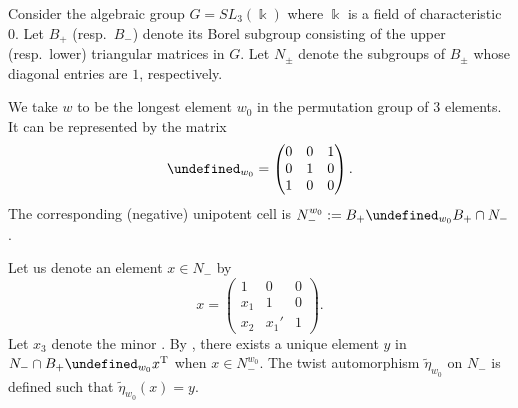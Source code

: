 \documentclass[10pt,a4paper]{amsart}
\newcommand{\kk}{\Bbbk}
\renewcommand{\tilde}[1]{\widetilde{#1}}
\newcommand{\opname}[1]{\operatorname{\mathsf{#1}}}
\let\trans\undefined
\newcommand{\trans}{\opname{P}}
\numberwithin{equation}{section}
\begin{document}
\begin{Example}\label{eg:twist_auto_matrix}
Consider the algebraic group $G=SL_{3}(\kk)$ where $\kk$ is a field
of characteristic $0$. Let $B_{+}$ (resp.\ $B_{-}$) denote its Borel
subgroup consisting of the upper (resp.\ lower) triangular matrices
in $G$. Let $N_{\pm}$ denote the subgroups of $B_{\pm}$ whose diagonal
entries are $1$, respectively.

We take $w$ to be the longest element $w_{0}$ in the permutation
group of $3$ elements. It can be represented by the matrix{\samepage \[\trans_{w_{0}}=\begin{pmatrix}
0 & 0 & 1\\
0 & 1 & 0\\
1 & 0 & 0
\end{pmatrix}.\] The corresponding (negative) unipotent cell is $N_{-}^{w_{0}}:=B_{+}\trans_{w_{0}}B_{+}\cap N_{-}$.}

Let us denote an element $x\in N_{-}$ by \[x=\begin{pmatrix}
1 & 0 & 0\\
x_{1} & 1 & 0\\
x_{2} & x_{1}' & 1
\end{pmatrix}.\] Let $x_{3}$ denote the minor . By \cite{berenstein1997total}, there exists a unique element $y$
in $N_{-}\cap B_{+}\trans_{w_{0}}x^{\rm T}$ when $x\in N_{-}^{w_{0}}$.
The twist automorphism $\tilde{\eta}_{w_{0}}$ on $N_{-}$ is defined
such that $\tilde{\eta}_{w_{0}}(x)=y$.


\end{Example}
\end{document}
